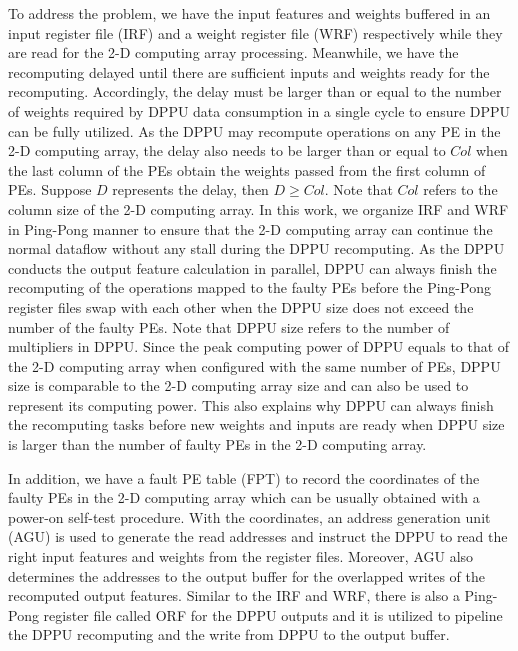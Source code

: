To address the problem, we have the input features and weights buffered in an input register file (IRF) and a weight register file (WRF) respectively while they are read for the 2-D computing array processing. Meanwhile, we have the recomputing delayed until there are sufficient inputs and weights ready for the recomputing. Accordingly, the delay must be larger than or equal to the number of weights required by DPPU data consumption in a single cycle to ensure DPPU can be fully utilized. As the DPPU may recompute operations on any PE in the 2-D computing array, the delay also needs to be larger than or equal to $Col$ when the last column of the PEs obtain the weights passed from the first column of PEs. Suppose $D$ represents the delay, then $D \geq Col$. Note that $Col$ refers to the column size of the 2-D computing array. In this work, we organize IRF and WRF in Ping-Pong manner to ensure that the 2-D computing array can continue the normal dataflow without any stall during the DPPU recomputing. As the DPPU conducts the output feature calculation in parallel, DPPU can always finish the recomputing of the operations mapped to the faulty PEs before the Ping-Pong register files swap with each other when the DPPU size does not exceed the number of the faulty PEs. Note that DPPU size refers to the number of multipliers in DPPU. Since the peak computing power of DPPU equals to that of the 2-D computing array when configured with the same number of PEs, DPPU size is comparable to the 2-D computing array size and can also be used to represent its computing power. This also explains why DPPU can always finish the recomputing tasks before new weights and inputs are ready when DPPU size is larger than the number of faulty PEs in the 2-D computing array. 

In addition, we have a fault PE table (FPT) to record the coordinates of the faulty PEs in the 2-D computing array which can be usually obtained with a power-on self-test procedure. With the coordinates, an address generation unit (AGU) is used to generate the read addresses and instruct the DPPU to read the right input features and weights from the register files. Moreover, AGU also determines the addresses to the output buffer for the overlapped writes of the recomputed output features. Similar to the IRF and WRF, there is also a Ping-Pong register file called ORF for the DPPU outputs and it is utilized to pipeline the DPPU recomputing and the write from DPPU to the output buffer.

